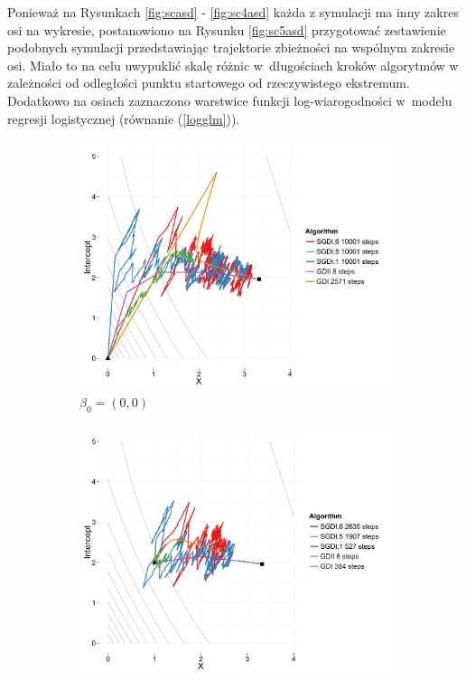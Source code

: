 \newpage

Ponieważ na Rysunkach \ref{fig:scasd} - \ref{fig:sc4asd} każda z symulacji ma inny zakres osi na wykresie, postanowiono na Rysunku \ref{fig:sc5asd} przygotować zestawienie podobnych symulacji przedstawiając trajektorie zbieżności na wspólnym zakresie osi. Miało to na celu uwypuklić skalę różnic w~długościach kroków algorytmów w zależności od odległości punktu startowego od rzeczywistego ekstremum. Dodatkowo na osiach zaznaczono warstwice funkcji log-wiarogodności w~modelu regresji logistycznej (równanie (\ref{logglm})).

\begin{figure}[h!]
  \begin{center}
   \begin{subfigure}[h!]{0.49\textwidth}
     \includegraphics[width=\textwidth]{Obrazki/contour_00.pdf}
     \caption{$\beta_0 = (0,0)$}
   \end{subfigure}
   \begin{subfigure}[h!]{0.49\textwidth}
        \includegraphics[width=\textwidth]{Obrazki/contour_2_1.pdf}

\end{subfigure}
\end{center}
\end{figure}

